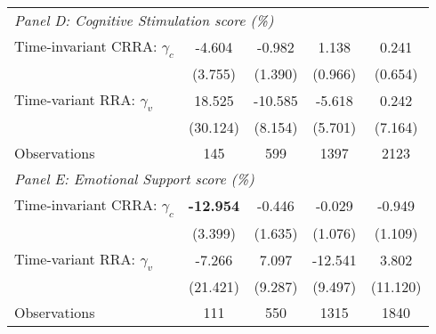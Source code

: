 {\begin{tabular}{l*{4}{c}}
\midrule
\multicolumn{5}{l}{\textit{Panel D: Cognitive Stimulation score (\%)}} \\
Time-invariant CRRA: $\gamma_c$&   -4.604         &   -0.982         &    1.138         &    0.241         \\
                &  (3.755)         &  (1.390)         &  (0.966)         &  (0.654)         \\
Time-variant RRA: $\gamma_v$&   18.525         &  -10.585         &   -5.618         &    0.242         \\
                & (30.124)         &  (8.154)         &  (5.701)         &  (7.164)         \\
\midrule
Observations    &      145         &      599         &     1397         &     2123         \\




\midrule
\multicolumn{5}{l}{\textit{Panel E: Emotional Support score (\%)}} \\
Time-invariant CRRA: $\gamma_c$&  \textbf{-12.954\sym{***}}&   -0.446         &   -0.029         &   -0.949         \\
                &  (3.399)         &  (1.635)         &  (1.076)         &  (1.109)         \\

Time-variant RRA: $\gamma_v$&   -7.266         &    7.097         &  -12.541         &    3.802         \\
                & (21.421)         &  (9.287)         &  (9.497)         & (11.120)         \\
\midrule
Observations    &      111         &      550         &     1315         &     1840         \\
\bottomrule
\end{tabular}
}
